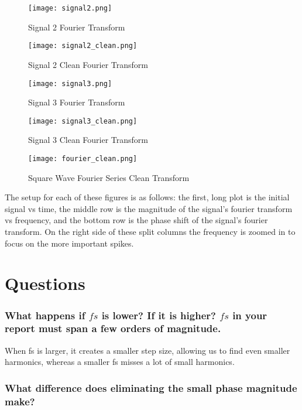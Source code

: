 \documentclass[12pt]{report}
\begin{document}
\begin{figure}[H]
    \centering
    \texttt{[image: signal2.png]}
    \caption{Signal 2 Fourier Transform}
\end{figure}

\begin{figure}[H]
    \centering
    \texttt{[image: signal2\_clean.png]}
    \caption{Signal 2 Clean Fourier Transform}
\end{figure}

\begin{figure}[H]
    \centering
    \texttt{[image: signal3.png]}
    \caption{Signal 3 Fourier Transform}
\end{figure}

\begin{figure}[H]
    \centering
    \texttt{[image: signal3\_clean.png]}
    \caption{Signal 3 Clean Fourier Transform}
\end{figure}

\begin{figure}[H]
    \centering
    \texttt{[image: fourier\_clean.png]}
    \caption{Square Wave Fourier Series Clean Transform}
\end{figure}

The setup for each of these figures is as follows: the first, long plot is the initial signal vs time, the middle row is the magnitude of the signal's fourier transform vs frequency, and the bottom row is the phase shift of the signal's fourier transform. On the right side of these split columns the frequency is zoomed in to focus on the more important spikes. 
 
 \section{Questions}
 \subsubsection{What happens if $fs$ is lower? If it is higher? $fs$ in your report must span a few orders of magnitude.}
 
When fs is larger, it creates a smaller step size, allowing us to find even smaller harmonics, whereas a smaller fs misses a lot of small harmonics. 
 
 \subsubsection{What difference does eliminating the small phase magnitude make?}
 
\end{document}
